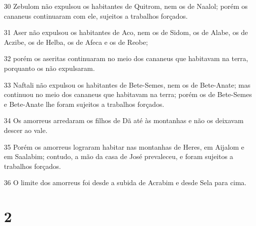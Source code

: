 \par 30 Zebulom não expulsou os habitantes de Quitrom, nem os de Naalol; porém os cananeus continuaram com ele, sujeitos a trabalhos forçados.
\par 31 Aser não expulsou os habitantes de Aco, nem os de Sidom, os de Alabe, os de Aczibe, os de Helba, os de Afeca e os de Reobe;
\par 32 porém os aseritas continuaram no meio dos cananeus que habitavam na terra, porquanto os não expulsaram.
\par 33 Naftali não expulsou os habitantes de Bete-Semes, nem os de Bete-Anate; mas continuou no meio dos cananeus que habitavam na terra; porém os de Bete-Semes e Bete-Anate lhe foram sujeitos a trabalhos forçados.
\par 34 Os amorreus arredaram os filhos de Dã até às montanhas e não os deixavam descer ao vale.
\par 35 Porém os amorreus lograram habitar nas montanhas de Heres, em Aijalom e em Saalabim; contudo, a mão da casa de José prevaleceu, e foram sujeitos a trabalhos forçados.
\par 36 O limite dos amorreus foi desde a subida de Acrabim e desde Sela para cima.

\chapter{2}

